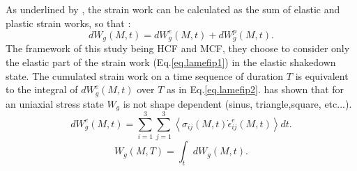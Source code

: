 As underlined by \cite{ellyin2012fatigue}, the strain work can be calculated as the sum of elastic and plastic strain works, so that :
$$dW_g(M,t)=dW_g^e(M,t)+dW_g^p(M,t).$$
The framework of this study being HCF and MCF, they choose to consider only the elastic part of the strain work (Eq.\eqref{eq.lamefip1}) in the elastic shakedown state. The cumulated strain work on a time
sequence of duration $T$ is equivalent to the integral of $dW_g^e(M,t)$ over $T$ as in Eq.\eqref{eq.lamefip2}. \cite{banvillet2003volumetric} has shown that for an uniaxial stress state $W_g$ is not shape dependent (sinus, triangle,square, etc...).
\begin{equation}
dW_g^e(M,t)=\sum_{i=1}^{3}\sum_{j=1}^{3}\left\langle\sigma_{ij}\left( M,t\right)\dot{\epsilon}_{ij}^e\left( M,t\right)\right\rangle dt .
\label{eq.lamefip1}
\end{equation}
\begin{equation}W_g(M,T)=\int_{t}dW_g(M,t).\label{eq.lamefip2}
\end{equation}

